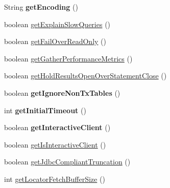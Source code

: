 \begin{DoxyCompactItemize}
\item 
\mbox{\label{interfacecom_1_1mysql_1_1jdbc_1_1_connection_properties_ad6d6a4b11c4de7735bb9ea2e312a4dcd}} 
String {\bfseries get\+Encoding} ()
\item 
boolean \mbox{\hyperlink{interfacecom_1_1mysql_1_1jdbc_1_1_connection_properties_a51ec93b6fe482627e109814e0985c940}{get\+Explain\+Slow\+Queries}} ()
\item 
boolean \mbox{\hyperlink{interfacecom_1_1mysql_1_1jdbc_1_1_connection_properties_a14f395dcf2b5c008aef09513895925f7}{get\+Fail\+Over\+Read\+Only}} ()
\item 
boolean \mbox{\hyperlink{interfacecom_1_1mysql_1_1jdbc_1_1_connection_properties_a90f58aa61c84d2072ba37c902aef8f9e}{get\+Gather\+Performance\+Metrics}} ()
\item 
boolean \mbox{\hyperlink{interfacecom_1_1mysql_1_1jdbc_1_1_connection_properties_a33f1647a0e97bcb10d880500fc9e8cf0}{get\+Hold\+Results\+Open\+Over\+Statement\+Close}} ()
\item 
\mbox{\label{interfacecom_1_1mysql_1_1jdbc_1_1_connection_properties_a66cabd59d360560dff42c5fac2400510}} 
boolean {\bfseries get\+Ignore\+Non\+Tx\+Tables} ()
\item 
\mbox{\label{interfacecom_1_1mysql_1_1jdbc_1_1_connection_properties_a1329677990754885da70917f9d2ac65d}} 
int {\bfseries get\+Initial\+Timeout} ()
\item 
\mbox{\label{interfacecom_1_1mysql_1_1jdbc_1_1_connection_properties_a2ba85b0e082fff2d2c40559c2b685b66}} 
boolean {\bfseries get\+Interactive\+Client} ()
\item 
boolean \mbox{\hyperlink{interfacecom_1_1mysql_1_1jdbc_1_1_connection_properties_a691575c40598ee5b000bed491d3ef096}{get\+Is\+Interactive\+Client}} ()
\item 
boolean \mbox{\hyperlink{interfacecom_1_1mysql_1_1jdbc_1_1_connection_properties_a97ae1e1a15afdeb0b6a04efd3d58459e}{get\+Jdbc\+Compliant\+Truncation}} ()
\item 
int \mbox{\hyperlink{interfacecom_1_1mysql_1_1jdbc_1_1_connection_properties_a9e88b2b4823f85f1ce0a95b4a7b9b5d5}{get\+Locator\+Fetch\+Buffer\+Size}} ()

\end{DoxyCompactItemize}
